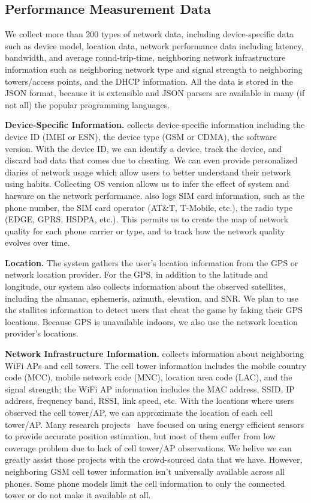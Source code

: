 \subsection{Performance Measurement Data}
\label{ss:measurements}
We collect more than 200 types of network data, including device-specific data such as device model,
location data, network performance data including latency, bandwidth, and average round-trip-time,
neighboring network infrastructure information such as neighboring network type and signal strength to
neighboring towers/access points, and the DHCP information. All the data is stored in the JSON format,
because it is extensible and JSON parsers are available in many (if not all) the popular programming
languages.


{\bfseries Device-Specific Information.} \name{} collects device-specific information including the device ID
(IMEI or ESN), the device type (GSM or CDMA), the software version. With the device ID, we can
identify a device, track the device, and discard bad data that comes due to cheating. We can
even provide personalized diaries of network usage which allow users to better understand their network
using habits.
Collecting OS version allows us to infer the effect of system and harware on the network performance. \name{} also
logs SIM card information, such as the phone number, the SIM card operator (AT\&T, T-Mobile, etc.),
the radio type (EDGE, GPRS, HSDPA, etc.).
This permits us to create the map of network quality for each phone carrier or type, and to track how the network quality
evolves over time.

{\bfseries Location.} The system gathers the user's location information from the GPS or network location provider.
For the GPS, in addition to the latitude and longitude, our system also collects information
about the observed satellites, including the almanac, ephemeris, azimuth, elevation, and SNR.
We plan to use the stallites information to detect users that cheat the game by faking their GPS locations.
Because GPS is unavailable indoors, we also use the network location provider's locations.


{\bfseries Network Infrastructure Information.} \name{} collects information about
neighboring WiFi APs and cell towers. The cell tower information includes the mobile country code (MCC),
mobile network code (MNC), location area code (LAC), and the signal strength; the WiFi AP information
includes the MAC address, SSID, IP address, frequency band, RSSI, link speed, etc.
With the locations where users observed the cell tower/AP, we can approximate the location of
each cell tower/AP. Many research projects~\cite{ctrack, vtrack-sensys09} have focused on using
energy efficient sensors to provide accurate position estimation, but most of them suffer from
low coverage problem due to lack of cell tower/AP observations. We belive we can greatly assist those projects
with the crowd-sourced data that we have. However, neighboring GSM cell tower information isn't
universally available across all phones. Some phone models limit the cell information to only
the connected tower or do not make it available at all.

